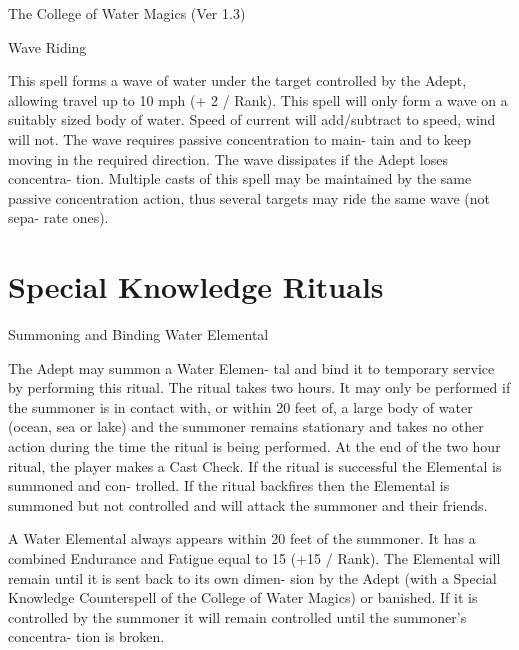 \begin{Chapter}{The College of Water Magics (Ver 1.3)}
\begin{spell}[S-15]{Wave Riding }

\begin{effects}
This spell forms a wave of water under the 
target  controlled  by  the  Adept,  allowing  travel  up 
to 10 mph (+ 2 / Rank). This spell will only form a 
wave  on  a  suitably  sized  body  of  water.  Speed  of 
current  will  add/subtract  to  speed,  wind  will  not. 
The  wave  requires  passive  concentration  to  main-
tain  and  to  keep  moving  in  the  required  direction. 
The  wave  dissipates  if  the  Adept  loses  concentra-
tion. Multiple casts of this spell may be maintained 
by  the  same  passive  concentration  action,  thus 
several  targets  may  ride  the  same  wave  (not  sepa-
rate ones). 


\end{effects}
\end{spell}

\section{Special Knowledge Rituals}

\begin{ritual}[R-1]{Summoning and Binding Water Elemental }

\begin{effects}
The Adept may summon a Water Elemen-
tal and bind it to temporary service by performing 
this  ritual.  The  ritual takes  two  hours.  It  may  only 
be performed if the summoner is in contact with, or 
within 20 feet of, a large body of water (ocean, sea 
or  lake)  and the  summoner  remains  stationary  and 
takes  no  other  action  during  the  time  the  ritual  is 
being performed. At the end of the two hour ritual, 
the  player  makes  a  Cast  Check.  If  the  ritual  is 
successful  the  Elemental  is  summoned  and  con-
trolled. If the ritual backfires then the Elemental is 
summoned  but  not  controlled  and  will  attack  the 
summoner and their friends. 

A  Water  Elemental  always  appears  within  20  feet 
of the summoner. It has a combined Endurance and 
Fatigue  equal  to  15  (+15  /  Rank).  The  Elemental 
will  remain  until  it  is  sent  back  to  its  own  dimen-
sion  by  the  Adept  (with  a  Special  Knowledge 
Counterspell  of  the  College  of  Water  Magics)  or 
banished. If it is controlled by the summoner it will 
remain controlled until the summoner’s concentra-
tion is broken. 

\end{effects}
\end{ritual}

\end{Chapter}

